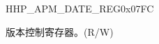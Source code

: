 \begin{register}{H}{HP\_APM\_DATE\_REG}{0x07FC}\label{regdesc:HPAPMDATEREG}
%
%
\regnewline%
\begin{regdesc}\begin{reglist}
\label{fielddesc:HPAPMDATE}\item [HP\_APM\_DATE] 版本控制寄存器。(R/W)
\end{reglist}\end{regdesc}
\end{register}


